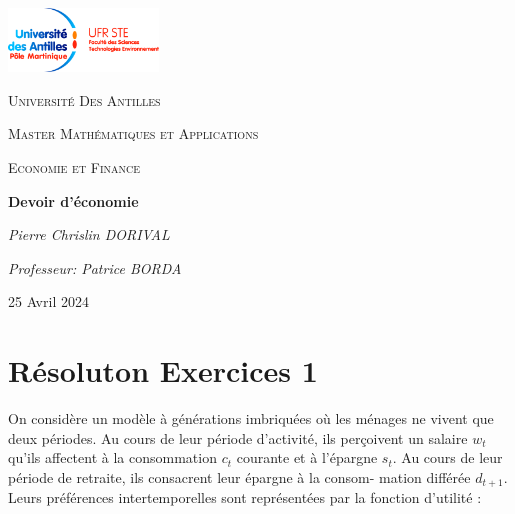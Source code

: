 \documentclass[11pt,twoside,a4paper]{article}
\begin{document}
\begin{titlepage}
    \centering
    \vspace*{1cm}
    \includegraphics[width=4cm]{logo.jpg} %
    \vfill
    {\scshape\Large Université Des Antilles \par} %
    \vspace{1cm}
    {\scshape\Large Master Mathématiques et Applications  \par} %
    {\scshape\Large Economie et Finance  \par}
    \vspace{3cm}
    {\huge\bfseries Devoir d'économie\par}
    \vspace{1cm}
    {\Large\itshape Pierre Chrislin DORIVAL\par} %
    \vspace{0.5cm}
    {\Large\itshape Professeur: Patrice BORDA\par} %
    \vfill
    {\large 25 Avril  2024 \par} %
\end{titlepage}

\section*{Résoluton Exercices 1}

On considère un modèle à générations imbriquées où les ménages ne vivent
que deux périodes. Au cours de leur période d'activité, ils perçoivent un
salaire $w_t$ qu'ils affectent à la consommation $c_t$ courante et à l'épargne $s_t$.
Au cours de leur période de retraite, ils consacrent leur épargne à la consom-
mation différée $d_{t+1}$. Leurs préférences intertemporelles sont représentées par
la fonction d'utilité :
\end{document}
